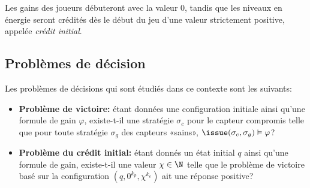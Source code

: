 Les gains des joueurs débuteront avec la valeur $0$, tandis que les niveaux en énergie seront crédités dès le début du jeu d'une valeur strictement positive, appelée \emph{crédit initial}.

\subsection{Problèmes de décision}

Les problèmes de décisions qui sont étudiés dans ce contexte sont les suivants:

\begin{itemize}
    \item \textbf{Problème de victoire:} étant données une configuration initiale ainsi qu'une formule de gain $\varphi$, existe-t-il une stratégie $\sigma_c$ pour le capteur compromis telle que pour toute stratégie $\sigma_g$ des capteurs «sains», $\issue(\sigma_c,\sigma_g) \vDash \varphi$?
    \item \textbf{Problème du crédit initial:} étant donnés un état initial $q$ ainsi qu'une formule de gain, existe-t-il une valeur $\chi \in \N$ telle que le problème de victoire basé sur la configuration $(q,0^{k_p},\chi^{k_e})$ ait une réponse positive?
\end{itemize}

